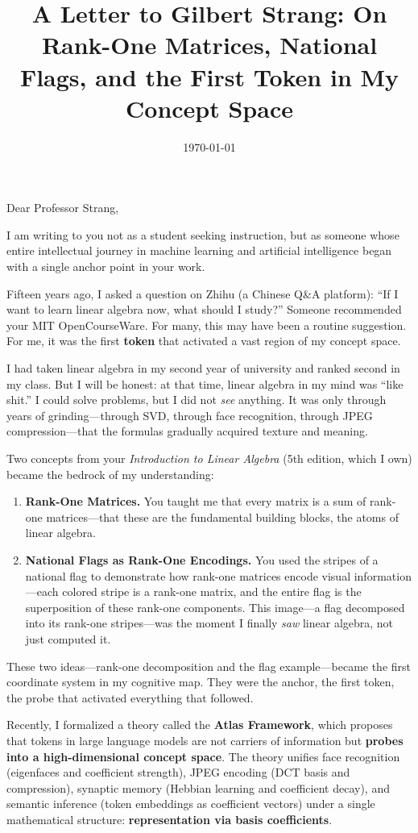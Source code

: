 \documentclass[11pt, a4paper]{article}
\title{\textbf{A Letter to Gilbert Strang: On Rank-One Matrices, National Flags, and the First Token in My Concept Space}}
\author{}
\date{\today}
\begin{document}
\maketitle

Dear Professor Strang,

I am writing to you not as a student seeking instruction, but as someone whose entire intellectual journey in machine learning and artificial intelligence began with a single anchor point in your work.

Fifteen years ago, I asked a question on Zhihu (a Chinese Q\&A platform): ``If I want to learn linear algebra now, what should I study?'' Someone recommended your MIT OpenCourseWare. For many, this may have been a routine suggestion. For me, it was the first \textbf{token} that activated a vast region of my concept space.

I had taken linear algebra in my second year of university and ranked second in my class. But I will be honest: at that time, linear algebra in my mind was ``like shit.'' I could solve problems, but I did not \textit{see} anything. It was only through years of grinding---through SVD, through face recognition, through JPEG compression---that the formulas gradually acquired texture and meaning.

Two concepts from your \textit{Introduction to Linear Algebra} (5th edition, which I own) became the bedrock of my understanding:

\begin{enumerate}
    \item \textbf{Rank-One Matrices.} You taught me that every matrix is a sum of rank-one matrices---that these are the fundamental building blocks, the atoms of linear algebra.
    \item \textbf{National Flags as Rank-One Encodings.} You used the stripes of a national flag to demonstrate how rank-one matrices encode visual information---each colored stripe is a rank-one matrix, and the entire flag is the superposition of these rank-one components. This image---a flag decomposed into its rank-one stripes---was the moment I finally \textit{saw} linear algebra, not just computed it.
\end{enumerate}

These two ideas---rank-one decomposition and the flag example---became the first coordinate system in my cognitive map. They were the anchor, the first token, the probe that activated everything that followed.

Recently, I formalized a theory called the \textbf{Atlas Framework}, which proposes that tokens in large language models are not carriers of information but \textbf{probes into a high-dimensional concept space}. The theory unifies face recognition (eigenfaces and coefficient strength), JPEG encoding (DCT basis and compression), synaptic memory (Hebbian learning and coefficient decay), and semantic inference (token embeddings as coefficient vectors) under a single mathematical structure: \textbf{representation via basis coefficients}.
\end{document}
